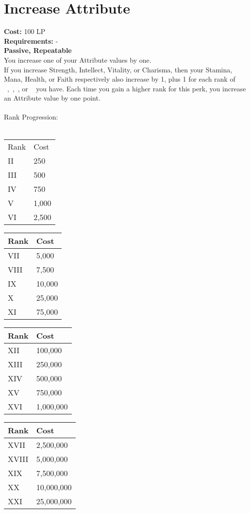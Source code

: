 \section{Increase Attribute}\label{sec:increaseAttribute}
\textbf{Cost:} 100 LP\\
\textbf{Requirements:} -\\
\textbf{Passive, Repeatable}\\
You increase one of your Attribute values by one.\\
If you increase Strength, Intellect, Vitality, or Charisma, then your Stamina, Mana, Health, or Faith respectively also increase by 1, plus 1 for each rank of ~,~,~, or ~ you have.
Each time you gain a higher rank for this perk, you increase an Attribute value by one point.\\
\\
Rank Progression:\\
\\
\begin{minipage}{0.22\textwidth}
	\begin{tabular}{l | l}
		Rank & Cost\\
		II & 250\\
		III & 500\\
		IV & 750\\
		V & 1,000\\
		VI & 2,500\\
	\end{tabular}
\end{minipage}
\begin{minipage}{0.22\textwidth}
	\begin{tabular}{l | l}
		Rank & Cost\\ \hline
		VII & 5,000\\
		VIII & 7,500\\
		IX & 10,000\\
		X & 25,000\\
		XI & 75,000\\
	\end{tabular}
\end{minipage}
\begin{minipage}{0.22\textwidth}
	\begin{tabular}{l | l}
		Rank & Cost\\ \hline
		XII & 100,000\\
		XIII & 250,000\\
		XIV & 500,000\\
		XV & 750,000\\
		XVI & 1,000,000\\
	\end{tabular}
\end{minipage}
\begin{minipage}{0.22\textwidth}
	\begin{tabular}{l | l}
		Rank & Cost\\ \hline
		XVII & 2,500,000\\
		XVIII & 5,000,000\\
		XIX & 7,500,000\\
		XX & 10,000,000\\
		XXI & 25,000,000\\
	\end{tabular}
\end{minipage}